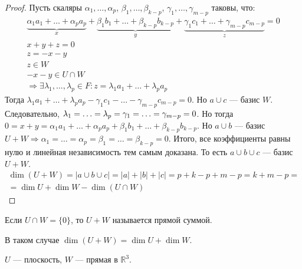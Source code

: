 \begin{proof}
Пусть скаляры $\alpha_1, \ldots, \alpha_p$, $\beta_1, \ldots, \beta_{k-p}$, $\gamma_1, \ldots, \gamma_{m-p}$ таковы, что:
\begin{gather*}
\underbrace{\alpha_1a_1+ \ldots +\alpha_pa_p}_x + \underbrace{\beta_1b_1+ \ldots +\beta_{k-p}b_{k-p}}_y + \underbrace{\gamma_1c_1 + \ldots + \gamma_{m-p}c_{m-p}}_z=0\\
x+y+z = 0\\
z = -x -y\\
z \in W\\
-x-y \in U\cap W\\
\Rightarrow \exists \lambda_1,\ldots, \lambda_p \in F \colon z = \lambda_1a_1+\ldots+\lambda_pa_p 
\end{gather*}
Тогда $\lambda_1a_1 + \ldots + \lambda_pa_p - \gamma_1c_1 - \ldots - \gamma_{m-p}c_{m-p} = 0$. Но $a \cup c$ --- базис $W$. Следовательно, $\lambda_1 \hm{=} \ldots = \lambda_p = \gamma_1 = \ldots = \gamma_{m-p} = 0$. Но тогда $0 = x+y = \alpha_1a_1 + \ldots + \alpha_pa_p + \beta_1b_1 + \ldots + \beta_{k-p}b_{k-p}$. Но $a\cup b$ --- базис $U+W \Rightarrow \alpha_1 = \ldots = \alpha_p = \beta_1 = \ldots = \beta_{k-p} = 0$. Итого, все коэффициенты равны нулю и линейная независимость тем самым доказана. То есть $a \cup b \cup c$ --- базис $U+W$. 
\begin{gather*}
    \dim \left(U+W\right) = |a\cup b \cup c| = |a| + |b| + |c| = p + k-p + m-p = k + m -p =\\
    =\dim U + \dim W - \dim\left(U\cap W\right)
\end{gather*}
\end{proof}

\begin{Def}
Если $U \cap W = \{0\}$, то $U + W$ называется прямой суммой.
\end{Def}
\begin{Consequence}
В таком случае $\dim\left(U+W\right) = \dim U + \dim W$.
\end{Consequence}
\begin{Examples}
    $U$ --- плоскость, $W$ --- прямая в $\mathbb{R}^3$.
\end{Examples}

